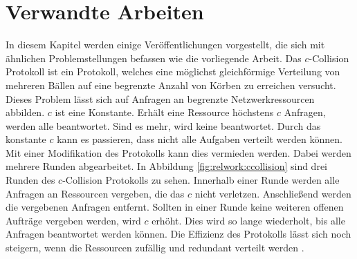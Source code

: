 \chapter{Verwandte Arbeiten}
\label{chap:relwork}
%
In diesem Kapitel werden einige Veröffentlichungen vorgestellt, die sich mit ähnlichen Problemstellungen befassen wie die vorliegende Arbeit.
Das $c$-Collision Protokoll \cite{ccol3} ist ein Protokoll, welches eine möglichst gleichförmige Verteilung von mehreren Bällen auf eine begrenzte Anzahl von Körben zu erreichen versucht. Dieses Problem lässt sich auf Anfragen an begrenzte Netzwerkressourcen abbilden. $c$ ist eine Konstante. Erhält eine Ressource höchstens $c$ Anfragen, werden alle beantwortet. Sind es mehr, wird keine beantwortet. Durch das konstante $c$ kann es passieren, dass nicht alle Aufgaben verteilt werden können. Mit einer Modifikation des Protokolls kann dies vermieden werden. Dabei werden mehrere Runden abgearbeitet. In Abbildung \ref{fig:relwork:ccollision} sind drei Runden des $c$-Collision Protokolls zu sehen. Innerhalb einer Runde werden alle Anfragen an Ressourcen vergeben, die das $c$ nicht verletzen. Anschließend werden die vergebenen Anfragen entfernt. Sollten in einer Runde keine weiteren offenen Aufträge vergeben werden, wird $c$ erhöht. Dies wird so lange wiederholt, bis alle Anfragen beantwortet werden können. Die Effizienz des Protokolls lässt sich noch steigern, wenn die Ressourcen zufällig und redundant verteilt werden \cite{ccol4}.
